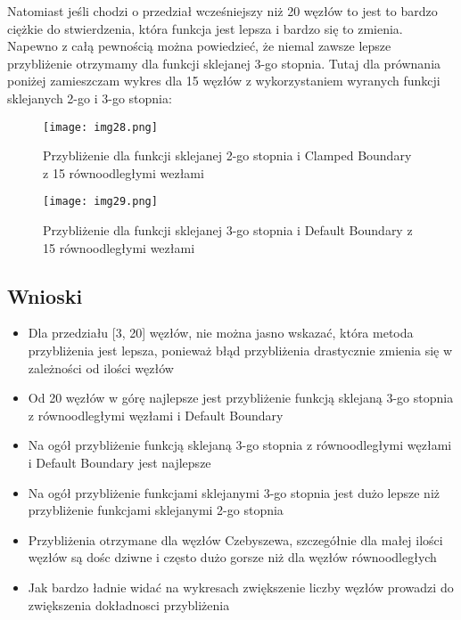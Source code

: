 \documentclass{article}
\begin{document}
\bigbreak
\noindent
Natomiast jeśli chodzi o przedział wcześniejszy niż 20 węzłów to jest to bardzo ciężkie do stwierdzenia, która funkcja jest lepsza i bardzo się to zmienia. Napewno z całą pewnością można powiedzieć, że niemal zawsze lepsze przybliżenie otrzymamy dla funkcji sklejanej 3-go stopnia. Tutaj dla prównania poniżej zamieszczam wykres dla 15 węzłów z wykorzystaniem wyranych funkcji sklejanych 2-go i 3-go stopnia:

\begin{figure}[H]
  \begin{minipage}[b]{0.49\textwidth}
    \texttt{[image: img28.png]}
    \caption{Przybliżenie dla funkcji sklejanej 2-go stopnia i Clamped Boundary z 15 równoodległymi wezłami}
  \end{minipage}
  \hfill
  \begin{minipage}[b]{0.49\textwidth}
    \texttt{[image: img29.png]}
    \caption{Przybliżenie dla funkcji sklejanej 3-go stopnia i Default Boundary z 15 równoodległymi wezłami}
  \end{minipage}
\end{figure}


\subsection{Wnioski}

\begin{itemize}
\item Dla przedziału [3, 20] węzłów, nie można jasno wskazać, która metoda przybliżenia jest lepsza, ponieważ błąd przybliżenia drastycznie zmienia się w zależności od ilości węzłów
\item Od 20 węzłów w górę najlepsze jest przybliżenie funkcją sklejaną 3-go stopnia z równoodległymi węzłami i Default Boundary
\item Na ogół przybliżenie funkcją sklejaną 3-go stopnia z równoodległymi węzłami i Default Boundary jest najlepsze
\item Na ogół przybliżenie funkcjami sklejanymi 3-go stopnia jest dużo lepsze niż przybliżenie funkcjami sklejanymi 2-go stopnia
\item Przybliżenia otrzymane dla węzłów Czebyszewa, szczegółnie dla małej ilości węzłów są dośc dziwne i często dużo gorsze niż dla węzłów równoodległych
\item Jak bardzo ładnie widać na wykresach zwiększenie liczby węzłów prowadzi do zwiększenia dokładnosci przybliżenia
\end{itemize}
\end{document}
